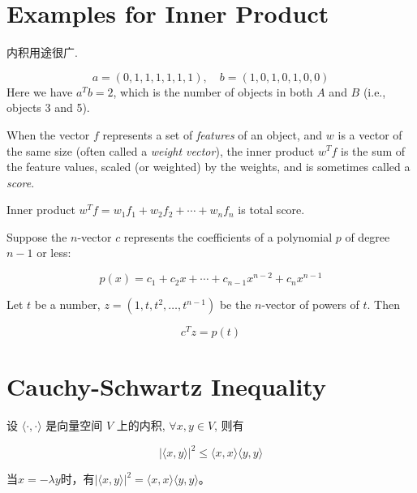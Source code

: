 \section{Examples for Inner Product}

内积用途很广.

\begin{example}[计算同时出现的项目数]
   $$
a=(0,1,1,1,1,1,1), \quad b=(1,0,1,0,1,0,0)
$$
Here we have $ a^{T} b=2 $, which is the number of objects in both $ A $ and $ B $ (i.e., objects 3 and 5). 
\end{example}

\begin{example}
    When the vector $f$ represents a set of \textit{features} of
    an object, and $w$ is a vector of the same size (often called a \textit{weight vector}), the
    inner product $w^T f$ is the sum of the feature values, scaled (or weighted) by
    the weights, and is sometimes called a \textit{score}.

    Inner product $ w^{T} f=w_{1} f_{1}+w_{2} f_{2}+\cdots+w_{n} f_{n} $ is total score. 

\end{example}

\begin{example}[多项式]
    Suppose the $ n $-vector $ c $ represents the coefficients of a polynomial $ p $ of degree $ n-1 $ or less:

    $$ p(x)=c_{1}+c_{2} x+\cdots+c_{n-1} x^{n-2}+c_{n} x^{n-1} $$

    Let $t$ be a number, $ z=\left(1, t, t^{2}, \ldots, t^{n-1}\right) $  be the $n$-vector of powers
    of $t$. Then

    $$ c^{T} z=p(t) $$
\end{example}


\section{Cauchy-Schwartz Inequality}
\begin{theorem}
    \label{thm:cauchy-schwartz=inequality}
    设 \( \langle \cdot,\cdot \rangle \) 是向量空间 \( V \) 上的内积, \( \forall x, y \in V \), 则有

    $$
|\langle x, y\rangle|^{2} \leq\langle x, x\rangle\langle y, y\rangle
$$

    当$x=-\lambda y$时，有$|\langle x, y\rangle|^{2}=\langle x, x\rangle\langle y, y\rangle$。
\end{theorem}

